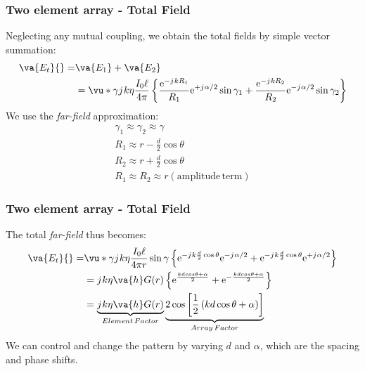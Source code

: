 \documentclass[10pt]{beamer}
\newcommand{\e}{\mathrm{e}} %
\renewcommand{\j}{{j}\mkern1mu} %
\begin{document}
\begin{frame}
    \frametitle{Two element array - Total Field}
Neglecting any mutual coupling, we obtain the total fields by simple vector summation:
\begin{align*}
    \va{E_t} {}=& \va{E_1} + \va{E_2} \\
    &= \vu*{\gamma} \j k \eta \frac{I_{0} \ell}{4 \pi}\left\{\frac{\e^{-\j k R_{1}}}{R_{1}} \e^{+\j \alpha / 2} \sin \gamma_{1}+\frac{\e^{-\j k R_{2}}}{R_{2}} \e^{-\j \alpha / 2} \sin \gamma_{2}\right\}
 \end{align*}
    We use the \textit{far-field} approximation:
    \begin{align*}
        \gamma_1 \approx \gamma_2 \approx \gamma \\
        R_1 \approx r - \frac{d}{2} \cos \theta \\
        R_2 \approx r + \frac{d}{2} \cos \theta \\
       R_1 \approx R_2 \approx r (\mathrm{amplitude \, term})
    \end{align*}
\end{frame}

\begin{frame}
    \frametitle{Two element array - Total Field}

    The total \textit{far-field} thus becomes:
    \begin{align*}
        \va{E_t} {}=& \vu*{\gamma} \j k \eta \frac{I_{0} \ell}{4 \pi r} \sin \gamma \left\{\e^{-\j k \frac{d}{2}\cos \theta } \e^{- \j \alpha / 2} + \e^{-\j k \frac{d}{2}\cos \theta } \e^{+\j \alpha / 2}\right\} \\
        &= \j k \eta \va{h} G(r) \left\{ \e^{\frac{k d cos \theta + \alpha}{2}} + \e^{-\frac{k d cos \theta + \alpha}{2}}\right\} \\
        &= \underbrace{\j k \eta \va{h} G(r)}_{Element \, Factor} \underbrace{2 \cos \left[\frac{1}{2}\left(k d \cos \theta + \alpha\right)\right]}_{Array \, Factor}
    \end{align*}
We can control and change the pattern by varying $d$ and $\alpha$, which are the spacing and phase shifts.
\end{frame}
\end{document}
